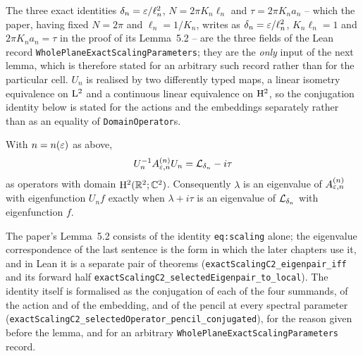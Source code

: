 The three exact identities $\delta_n=\varepsilon/\ell_n^2$, $N=2\pi K_n\ell_n$ and
$\tau=2\pi K_na_n$ -- which the paper, having fixed $N=2\pi$ and $\ell_n=1/K_n$, writes
as $\delta_n=\varepsilon/\ell_n^2$, $K_n\ell_n=1$ and $2\pi K_na_n=\tau$ in the proof of its
Lemma~5.2 -- are the
three fields of the Lean record
\texttt{WholePlaneExactScalingParameters}; they are the \emph{only} input of the next
lemma, which is therefore stated for an arbitrary such record rather than for the
particular cell.  $U_n$ is realised by two differently typed maps, a linear isometry
equivalence on $\mathrm{L}^2$ and a continuous linear equivalence on $\mathrm{H}^2$, so the conjugation
identity below is stated for the actions and the embeddings separately rather than as an
equality of \texttt{DomainOperator}s.

\begin{lemma}[Scaling]
  \label{lem:exact-renormalization}
  \leanok
  With $n=n(\varepsilon)$ as above,
  \begin{equation}
    U_n^{-1}A^{(n)}_{\varepsilon,n}U_n=\mathcal{L}_{\delta_n}-i\tau
    \label{eq:operator:exact-scaling}
  \end{equation}
  as operators with domain $\mathrm{H}^2(\mathbb{R}^2;\mathbb{C}^2)$.  Consequently $\lambda$ is an eigenvalue of
  $A^{(n)}_{\varepsilon,n}$ with eigenfunction $U_nf$ exactly when $\lambda+i\tau$ is an
  eigenvalue of $\mathcal{L}_{\delta_n}$ with eigenfunction $f$.
\end{lemma}

The paper's Lemma~5.2 consists of the identity \texttt{eq:scaling} alone; the eigenvalue
correspondence of the last sentence is the form in which the later chapters use it, and in
Lean it is a separate pair of theorems (\texttt{exactScalingC2\_eigenpair\_iff} and its
forward half \texttt{exactScalingC2\_selectedEigenpair\_to\_local}).  The identity itself is
formalised as the conjugation of each of the four summands, of the action and of the
embedding, and of the pencil at every spectral parameter
(\texttt{exactScalingC2\_selectedOperator\_pencil\_conjugated}), for the reason given
before the lemma, and for an arbitrary \texttt{WholePlaneExactScalingParameters} record.

